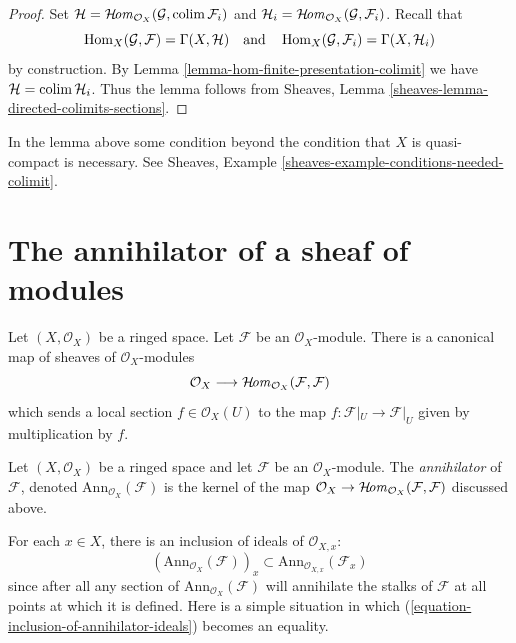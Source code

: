 \begin{proof}
Set
$\mathcal{H} = \mathop{\mathcal{H}\!\mathit{om}}\nolimits_{\mathcal{O}_X}(\mathcal{G}, \mathop{\mathrm{colim}}\nolimits \mathcal{F}_i)$
and $\mathcal{H}_i = \mathop{\mathcal{H}\!\mathit{om}}\nolimits_{\mathcal{O}_X}(\mathcal{G}, \mathcal{F}_i)$.
Recall that
$$
\mathop{\mathrm{Hom}}\nolimits_X(\mathcal{G}, \mathcal{F}) = \Gamma(X, \mathcal{H})
\quad\text{and}\quad
\mathop{\mathrm{Hom}}\nolimits_X(\mathcal{G}, \mathcal{F}_i) = \Gamma(X, \mathcal{H}_i)
$$
by construction. By Lemma \ref{lemma-hom-finite-presentation-colimit} we have
$\mathcal{H} = \mathop{\mathrm{colim}}\nolimits \mathcal{H}_i$. Thus the lemma follows from
Sheaves, Lemma \ref{sheaves-lemma-directed-colimits-sections}.
\end{proof}

\begin{remark}
\label{remark-condition-necessary}
In the lemma above some condition beyond the condition that $X$
is quasi-compact is necessary. See
Sheaves, Example \ref{sheaves-example-conditions-needed-colimit}.
\end{remark}




\section{The annihilator of a sheaf of modules}
\label{section-annihilator}

\noindent
Let $(X, \mathcal{O}_X)$ be a ringed space.
Let $\mathcal{F}$ be an $\mathcal{O}_X$-module.
There is a canonical map of sheaves of $\mathcal{O}_X$-modules
$$
\mathcal{O}_X
\longrightarrow
\mathop{\mathcal{H}\!\mathit{om}}\nolimits_{\mathcal{O}_X}(\mathcal{F}, \mathcal{F})
$$
which sends a local section $f \in \mathcal{O}_X(U)$ to the map
$f : \mathcal{F}|_U \to \mathcal{F}|_U$ given by multiplication by $f$.

\begin{definition}
\label{definition-annihilator-sheaf}
Let $(X, \mathcal{O}_X)$ be a ringed space and let $\mathcal{F}$
be an $\mathcal{O}_X$-module. The {\it annihilator} of $\mathcal{F}$,
denoted $\text{Ann}_{\mathcal{O}_X}(\mathcal{F})$
is the kernel of the map
$\mathcal{O}_X \to \mathop{\mathcal{H}\!\mathit{om}}\nolimits_{\mathcal{O}_X}(\mathcal{F}, \mathcal{F})$
discussed above.
\end{definition}

\noindent
For each $x\in X$, there is an inclusion of ideals of $\mathcal{O}_{X, x}$:
\begin{equation}
\label{equation-inclusion-of-annihilator-ideals}
(\text{Ann}_{\mathcal{O}_X}(\mathcal{F}))_x
\subset
\text{Ann}_{\mathcal{O}_{X, x}}(\mathcal{F}_x)
\end{equation}
since after all any section of $\text{Ann}_{\mathcal{O}_X}(\mathcal{F})$
will annihilate the stalks of $\mathcal{F}$ at all points at which it is
defined. Here is a simple situation in which
(\ref{equation-inclusion-of-annihilator-ideals}) becomes an equality.

